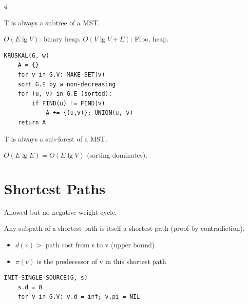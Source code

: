 \documentclass[8pt,a4paper,landscape]{extarticle}
\begin{document}
\begin{multicols*}{4}
\begin{thm}[title=Why does it work?]
T is always a subtree of a MST.
\end{thm}

\begin{prop}[title=Prim's runtime]
$O(E\lg V)$: binary heap. $O(V\lg V+E)$: Fibo. heap.
\end{prop}

\begin{lstlisting}
KRUSKAL(G, w)
    A = {}
    for v in G.V: MAKE-SET(v)
    sort G.E by w non-decreasing
    for (u, v) in G.E (sorted):
        if FIND(u) != FIND(v)
            A += {(u,v)}; UNION(u, v)
    return A
\end{lstlisting}

\begin{thm}[title=Why does it work?]
T is always a sub-forest of a MST.
\end{thm}

\begin{prop}[title=Kruskal's runtime]
$O(E\lg E) = O(E\lg V)$ (sorting dominates).
\end{prop}


\section{Shortest Paths}

\begin{warn}[title=Negative weights]
Allowed but no negative-weight cycle.
\end{warn}

\begin{prop}[title=Optimal substructure]
Any subpath of a shortest path is itself a shortest path (proof by contradiction).
\end{prop}

\begin{warn}[title=Helpful tools]
\begin{itemize}
  \item $d(v) > $ path cost from s to v (upper bound)
  \item $\pi(v) $ is the predecessor of v in this shortest path
\end{itemize}
\end{warn}

\begin{lstlisting}
INIT-SINGLE-SOURCE(G, s)
    s.d = 0
    for v in G.V: v.d = inf; v.pi = NIL


\end{lstlisting}
\end{multicols*}
\end{document}

